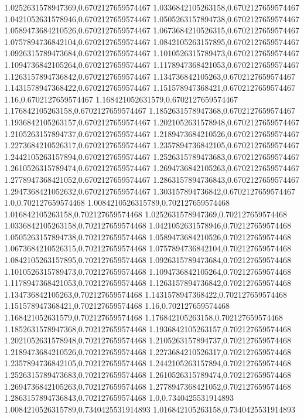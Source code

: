 1.0252631578947369,0.6702127659574467
1.0336842105263158,0.6702127659574467
1.0421052631578946,0.6702127659574467
1.0505263157894738,0.6702127659574467
1.0589473684210526,0.6702127659574467
1.0673684210526315,0.6702127659574467
1.0757894736842104,0.6702127659574467
1.0842105263157895,0.6702127659574467
1.0926315789473684,0.6702127659574467
1.1010526315789473,0.6702127659574467
1.1094736842105264,0.6702127659574467
1.1178947368421053,0.6702127659574467
1.1263157894736842,0.6702127659574467
1.134736842105263,0.6702127659574467
1.1431578947368422,0.6702127659574467
1.151578947368421,0.6702127659574467
1.16,0.6702127659574467
1.168421052631579,0.6702127659574467
1.176842105263158,0.6702127659574467
1.1852631578947368,0.6702127659574467
1.1936842105263157,0.6702127659574467
1.2021052631578948,0.6702127659574467
1.2105263157894737,0.6702127659574467
1.2189473684210526,0.6702127659574467
1.2273684210526317,0.6702127659574467
1.2357894736842105,0.6702127659574467
1.2442105263157894,0.6702127659574467
1.2526315789473683,0.6702127659574467
1.2610526315789474,0.6702127659574467
1.2694736842105263,0.6702127659574467
1.2778947368421052,0.6702127659574467
1.2863157894736843,0.6702127659574467
1.2947368421052632,0.6702127659574467
1.303157894736842,0.6702127659574467
1.0,0.702127659574468
1.0084210526315789,0.702127659574468
1.016842105263158,0.702127659574468
1.0252631578947369,0.702127659574468
1.0336842105263158,0.702127659574468
1.0421052631578946,0.702127659574468
1.0505263157894738,0.702127659574468
1.0589473684210526,0.702127659574468
1.0673684210526315,0.702127659574468
1.0757894736842104,0.702127659574468
1.0842105263157895,0.702127659574468
1.0926315789473684,0.702127659574468
1.1010526315789473,0.702127659574468
1.1094736842105264,0.702127659574468
1.1178947368421053,0.702127659574468
1.1263157894736842,0.702127659574468
1.134736842105263,0.702127659574468
1.1431578947368422,0.702127659574468
1.151578947368421,0.702127659574468
1.16,0.702127659574468
1.168421052631579,0.702127659574468
1.176842105263158,0.702127659574468
1.1852631578947368,0.702127659574468
1.1936842105263157,0.702127659574468
1.2021052631578948,0.702127659574468
1.2105263157894737,0.702127659574468
1.2189473684210526,0.702127659574468
1.2273684210526317,0.702127659574468
1.2357894736842105,0.702127659574468
1.2442105263157894,0.702127659574468
1.2526315789473683,0.702127659574468
1.2610526315789474,0.702127659574468
1.2694736842105263,0.702127659574468
1.2778947368421052,0.702127659574468
1.2863157894736843,0.702127659574468
1.0,0.7340425531914893
1.0084210526315789,0.7340425531914893
1.016842105263158,0.7340425531914893
